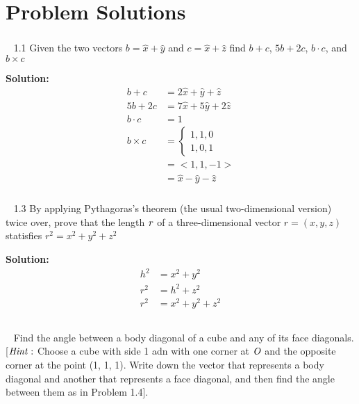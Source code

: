 \documentclass{article}
\newcommand\Problem{%
    \subsubsection{}~%
}
\newcommand\TheSolution{%
  \textbf{Solution:}\\%
}
\begin{document}
\section{Problem Solutions}
\Problem 1.1 Given the two vectors $b = \hat{x} + \hat{y}$ and $c = \hat{x} + \hat{z}$ find $b + c$, $5b + 2c$, $b \cdot c$, and $b \times c$

\TheSolution {
    \begin{equation}
        \begin{aligned}
            b + c      & = 2\hat{x} + \hat{y} + \hat{z}   \\
            5b + 2c    & = 7\hat{x} + 5\hat{y} + 2\hat{z} \\
            b \cdot c  & = 1                              \\
            b \times c & = \begin{cases}
                               1, 1, 0 \\
                               1, 0, 1
                           \end{cases}                   \\
                       & = <1, 1, -1>                     \\
                       & = \hat{x} - \hat{y} - \hat{z}
        \end{aligned}
    \end{equation}
}

\Problem 1.3 By applying Pythagoras's theorem (the usual two-dimensional version) twice over, prove that the length $\it{r}$ of a three-dimensional vector $r = (x, y, z)$ statisfies $r^2 = x^2 + y^2 + z^2$

\TheSolution
\begin{equation}
    \begin{aligned}
        h^2 & = x^2 + y^2       \\
        r^2 & = h^2 + z^2       \\
        r^2 & = x^2 + y^2 + z^2 \\
    \end{aligned}
\end{equation}

\Problem Find the angle between a body diagonal of a cube and any of its face diagonals. [$\it{Hint:}$ Choose a cube with side 1 adn with one corner at $\it{O}$ and the opposite corner at the point (1, 1, 1). Write down the vector that represents a body diagonal and another that represents a face diagonal, and then find the angle between them as in Problem 1.4].
\end{document}
